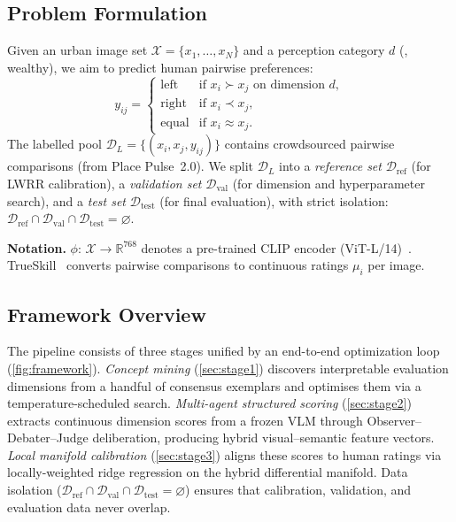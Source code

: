 \documentclass[runningheads]{llncs}
\begin{document}
\subsection{Problem Formulation}
\label{sec:formulation}

Given an urban image set $\mathcal{X}{=}\{x_1,\ldots,x_N\}$ and a perception category $d$ (\eg, wealthy), we aim to predict human pairwise preferences:
\begin{equation}
y_{ij} =
\begin{cases}
\text{left}  & \text{if } x_i \succ x_j \text{ on dimension } d,\\
\text{right} & \text{if } x_i \prec x_j,\\
\text{equal} & \text{if } x_i \approx x_j.
\end{cases}
\label{eq:pairwise}
\end{equation}
The labelled pool $\mathcal{D}_{L}{=}\{(x_i,x_j,y_{ij})\}$ contains crowdsourced pairwise comparisons (from Place Pulse~2.0).
We split $\mathcal{D}_{L}$ into a \emph{reference set} $\mathcal{D}_{\mathrm{ref}}$ (for LWRR calibration), a \emph{validation set} $\mathcal{D}_{\mathrm{val}}$ (for dimension and hyperparameter search), and a \emph{test set} $\mathcal{D}_{\mathrm{test}}$ (for final evaluation), with strict isolation: $\mathcal{D}_{\mathrm{ref}} \cap \mathcal{D}_{\mathrm{val}} \cap \mathcal{D}_{\mathrm{test}} = \varnothing$.

\noindent\textbf{Notation.}
$\phi{:}\,\mathcal{X}{\to}\mathbb{R}^{768}$ denotes a pre-trained CLIP encoder (ViT-L/14)~\cite{radford2021learning}.
TrueSkill~\cite{herbrich2006trueskill} converts pairwise comparisons to continuous ratings $\mu_i$ per image.

\subsection{Framework Overview}
\label{sec:overview}

The pipeline consists of three stages unified by an end-to-end optimization loop (\cref{fig:framework}).
\emph{Concept mining} (\cref{sec:stage1}) discovers interpretable evaluation dimensions from a handful of consensus exemplars and optimises them via a temperature-scheduled search.
\emph{Multi-agent structured scoring} (\cref{sec:stage2}) extracts continuous dimension scores from a frozen VLM through Observer--Debater--Judge deliberation, producing hybrid visual--semantic feature vectors.
\emph{Local manifold calibration} (\cref{sec:stage3}) aligns these scores to human ratings via locally-weighted ridge regression on the hybrid differential manifold.
Data isolation ($\mathcal{D}_{\mathrm{ref}} \cap \mathcal{D}_{\mathrm{val}} \cap \mathcal{D}_{\mathrm{test}} = \varnothing$) ensures that calibration, validation, and evaluation data never overlap.
\end{document}
